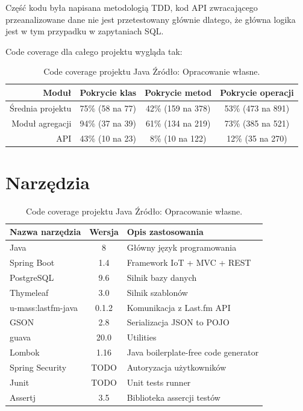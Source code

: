 \documentclass[brudnopis]{xmgr}
\begin{document}
Część kodu była napisana metodologią TDD,
kod API zwracającego przeanalizowane dane nie jest przetestowany głównie dlatego,
że główna logika jest w tym przypadku w zapytaniach SQL.

Code coverage dla całego projektu wygląda tak:
\begin{table}

	\begin{tabular}{|r|c|c|c|}
		\hline
		Moduł & Pokrycie klas & Pokrycie metod & Pokrycie operacji \\ \hline
		Średnia projektu & 75\% (58 na 77) & 42\% (159 na 378) & 53\% (473 na 891) \\
		Moduł agregacji & 94\% (37 na 39) & 61\% (134 na 219) & 73\% (385 na 521) \\
		API & 43\% (10 na 23) & 8\% (10 na 122) & 12\% (35 na 270) \\  \hline
	\end{tabular}

    \caption{
	Code coverage projektu Java
	\newline Źródło: Opracowanie własne.
	}
\label{Projekt --- Code coverage}
\end{table}

\section{Narzędzia}

\begin{table}
\begin{tabular}{|l|c|l|}
	\hline
	Nazwa narzędzia & Wersja & Opis zastosowania \\
	\hline
	Java & 8 & Główny język programowania \\
	\hline
	Spring Boot & 1.4 & Framework IoT + MVC + REST \\
	\hline
	PostgreSQL & 9.6 & Silnik bazy danych \\
	\hline
	Thymeleaf & 3.0 & Silnik szablonów \\
	\hline
	u-mass:lastfm-java & 0.1.2 & Komunikacja z Last.fm API \\
	\hline
	GSON & 2.8 & Serializacja JSON to POJO \\
	\hline
	guava & 20.0 & Utilities \\
	\hline
	Lombok & 1.16 & Java boilerplate-free code generator \\
	\hline
	Spring Security & TODO & Autoryzacja użytkowników \\
	\hline
	Junit & TODO & Unit tests runner \\
	\hline
	Assertj & 3.5 & Biblioteka assercji testów \\
	\hline
\end{tabular}
    \caption{
	Code coverage projektu Java
	\newline Źródło: Opracowanie własne.
	}
	\label{Projekt - Code coverage}
\end{table}





\listoftables

\listoffigures

\oswiadczenie
\end{document}

